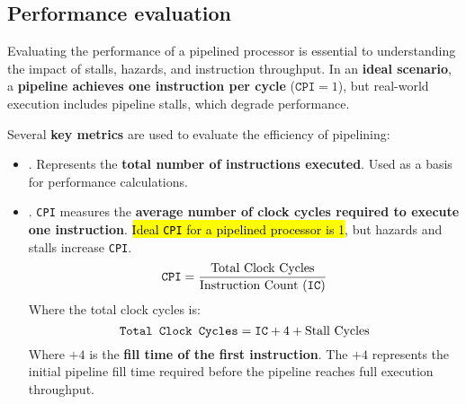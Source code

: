 \subsection{Performance evaluation}

Evaluating the performance of a pipelined processor is essential to understanding the impact of stalls, hazards, and instruction throughput. In an \textbf{ideal scenario}, a \textbf{pipeline achieves one instruction per cycle} ($\texttt{CPI} = 1$), but real-world execution includes pipeline stalls, which degrade performance.

\highspace
Several \textbf{key metrics} are used to evaluate the efficiency of pipelining:
\begin{itemize}
   \item {}. Represents the \textbf{total number of instructions executed}. Used as a basis for performance calculations.
   
   \item {}. \texttt{CPI} measures the \textbf{average number of clock cycles required to execute one instruction}. \hl{Ideal \texttt{CPI} for a pipelined processor is 1}, but hazards and stalls increase \texttt{CPI}.
   \begin{equation}\label{eq: Clocks Per Instruction CPI}
      \texttt{CPI} = \dfrac{
         \text{Total Clock Cycles}
      }{
         \text{Instruction Count (\texttt{IC})}
      }
   \end{equation}
   Where the total clock cycles is:
   \begin{equation}\index{Formula: Total Clock Cycles}
      \texttt{Total Clock Cycles} = \texttt{IC} + 4 + \text{Stall Cycles}
   \end{equation}
   Where $+4$ is the \textbf{fill time of the first instruction}. The $+4$ represents the initial pipeline fill time required before the pipeline reaches full execution throughput.


\end{itemize}
